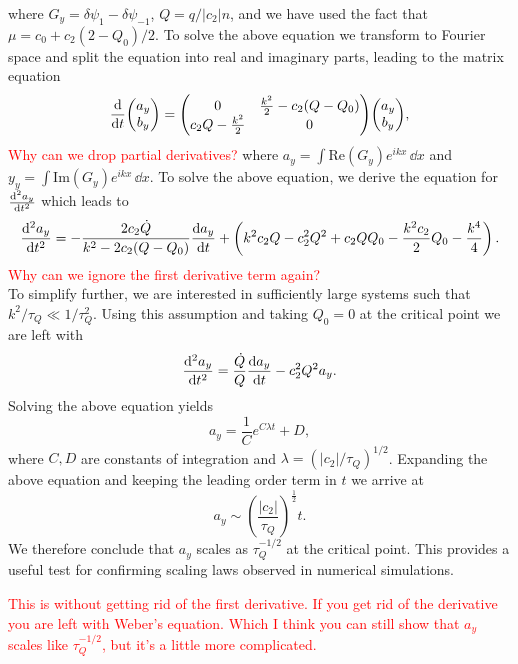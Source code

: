 where \( G_y = \delta\psi_1 - \delta\psi_{-1} \), \( Q=q/|c_2|n \), and we have
used the fact that \( \mu = c_0 + c_2(2-Q_0)/2 \).
To solve the above equation we transform to Fourier space and split the equation
into real and imaginary parts, leading to the matrix equation
\begin{equation}
    \dv{t} \mqty(a_y \\ b_y) = \mqty(0 & \frac{k^2}{2}-c_2(Q-Q_0) \\
                                     c_2Q - \frac{k^2}{2} & 0)
                                \mqty(a_y \\ b_y),
\end{equation}
\textcolor{red}{Why can we drop partial derivatives?}
where \( a_y = \int \mathrm{Re}(G_y)e^{ikx} \, \dd x \) and
\( y_y = \int \mathrm{Im}(G_y)e^{ikx} \, \dd x \).
To solve the above equation, we derive the equation for \( \dv[2]{a_y}{t} \)
which leads to
\begin{equation}
    \dv[2]{a_y}{t} = -\frac{2c_2\dot{Q}}{k^2 - 2c_2(Q-Q_0)}\dv{a_y}{t} 
    + \left(k^2c_2Q - c_2^2Q^2 + c_2QQ_0 - \frac{k^2c_2}{2}Q_0 
    - \frac{k^4}{4}\right).
\end{equation}
\textcolor{red}{Why can we ignore the first derivative term again?}\\
To simplify further, we are interested in sufficiently large systems such that
\( k^2/\tau_Q \ll 1 / \tau_Q^2 \).
Using this assumption and taking \(Q_0=0 \) at the critical point we are left
with
\begin{equation}
    \dv[2]{a_y}{t} = \frac{\dot{Q}}{Q}\dv{a_y}{t} - c_2^2Q^2a_y.
\end{equation}
Solving the above equation yields
\begin{equation}
    a_y = \frac{1}{C}e^{C\lambda t} + D,
\end{equation}
where \( C, D \) are constants of integration and
\( \lambda ={(|c_2|/\tau_Q)}^{1/2} \).
Expanding the above equation and keeping the leading order term in \( t \) we
arrive at
\begin{equation}
    a_y \sim {\left(\frac{|c_2|}{\tau_Q}\right)}^{\frac{1}{2}}t.
\end{equation}
We therefore conclude that \( a_y \) scales as \( \tau_Q^{-1/2} \) at the
critical point.
This provides a useful test for confirming scaling laws observed in numerical
simulations.

\textcolor{red}{This is without getting rid of the first derivative.
If you get rid of the derivative you are left with Weber's equation. Which
I think you can still show that \( a_y \) scales like \( \tau_Q^{-1/2} \),
but it's a little more complicated.}

